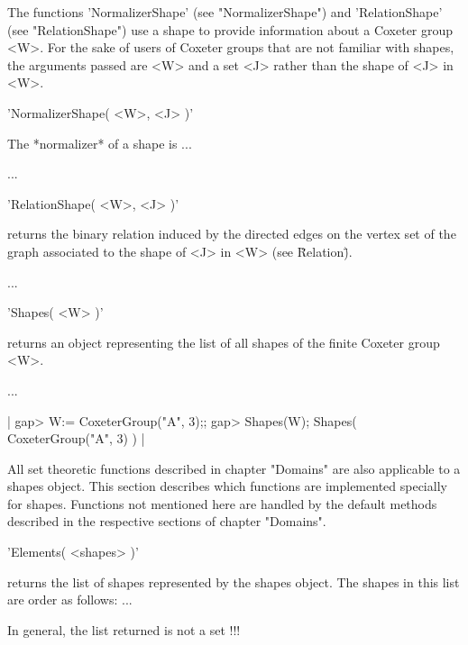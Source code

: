 
The    functions    'NormalizerShape'    (see   "NormalizerShape")    and
'RelationShape' (see "RelationShape") use  a shape to provide information
about a Coxeter group <W>.  For  the sake of users of Coxeter groups that
are not familiar with shapes, the  arguments passed are <W> and a set <J>
rather than the shape of <J> in <W>.



'NormalizerShape( <W>, <J> )'

The *normalizer* of a shape is ...

...


'RelationShape( <W>, <J> )'

returns the binary  relation induced by the directed  edges on the vertex
set of the graph associated to the shape of <J> in <W> (see \"Relation\").

...


'Shapes( <W> )'

returns  an object  representing the  list of  all shapes  of  the finite
Coxeter group <W>.

...

|    gap> W:= CoxeterGroup("A", 3);;
    gap> Shapes(W);
    Shapes( CoxeterGroup("A", 3) ) |


All  set theoretic  functions  described in  chapter  "Domains" are  also
applicable to  a shapes object.   This section describes  which functions
are implemented  specially for shapes.  Functions not  mentioned here are
handled by  the default methods  described in the respective  sections of
chapter "Domains".

'Elements( <shapes> )'

returns the list of shapes represented by the shapes object.  The shapes
in this list are order as follows: ...

In general, the list returned is not a set !!!

